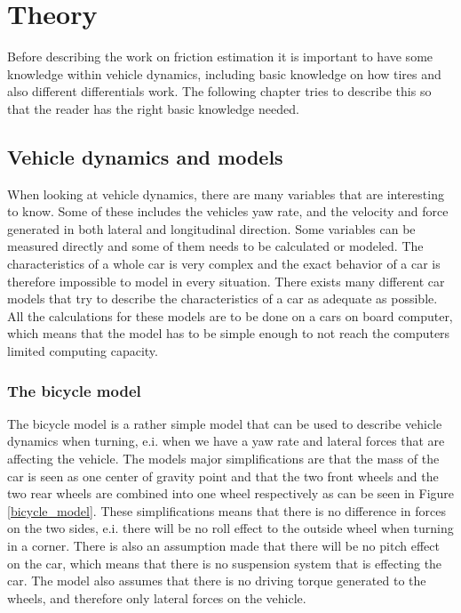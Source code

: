 \chapter{Theory}

Before describing the work on friction estimation it is important to have some knowledge within vehicle dynamics, including basic knowledge on how tires and also different differentials work. The following chapter tries to describe this so that the reader has the right basic knowledge needed.

\section{Vehicle dynamics and models}

When looking at vehicle dynamics, there are many variables that are interesting to know. Some of these includes the vehicles yaw rate, and the velocity and force generated in both lateral and longitudinal direction. Some variables can be measured directly and some of them needs to be calculated or modeled. The characteristics of a whole car is very complex and the exact behavior of a car is therefore impossible to model in every situation. There exists many different car models that try to describe the characteristics of a car as adequate as possible. All the calculations for these models are to be done on a cars on board computer, which means that the model has to be simple enough to not reach the computers limited computing capacity.

\subsection{The bicycle model}

The bicycle model is a rather simple model that can be used to describe vehicle dynamics when turning, e.i. when we have a yaw rate and lateral forces that are affecting the vehicle. The models major simplifications are that the mass of the car is seen as one center of gravity point and that the two front wheels and the two rear wheels are combined into one wheel respectively as can be seen in Figure \ref{bicycle_model}. These simplifications means that there is no difference in forces on the two sides, e.i. there will be no roll effect to the outside wheel when turning in a corner. There is also an assumption made that there will be no pitch effect on the car, which means that there is no suspension system that is effecting the car. The model also assumes that there is no driving torque generated to the wheels, and therefore only lateral forces on the vehicle.

